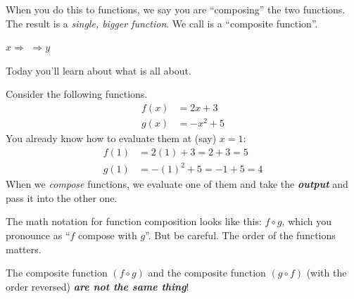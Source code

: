 \documentclass[fleqn,letterpaper,12pt,printwatermark=false]{memoir}
\begin{document}
\begin{myLesson}
    When you do this to functions,
    we say you are ``composing'' the two functions.
    The result is a \emph{single, bigger function}.
    We call is a ``composite function''.

    \begin{center}
    \vspace{2em}
    \(
        x
        \Longrightarrow
    \)
    \(
        \Longrightarrow
        y
    \)
    \vspace{2em}
    \end{center}
    Today you'll learn about what 
    is all about.
\end{myLesson}

\begin{myLesson}[][1]
    Consider the following functions.
    \begin{align*}
        f(x) &= 2x + 3 \\
        g(x) &= -x^2 + 5
    \end{align*}
    You already know how to evaluate them at (say) $x=1$:
    \begin{align*}
        f(1) &= 2(1) + 3   = 2+3    = 5\\
        g(1) &= -(1)^2 + 5 = -1 + 5 = 4
    \end{align*}
    When we \emph{compose} functions, 
    we evaluate one of them and take the {\bfseries\itshape output} and pass it 
    into the other one.

    The math notation for function composition looks like this:
    $f \circ g$,
    which you pronounce as ``$f$ compose with $g$''. 
    But be careful.
    The order of the functions matters.
    \begin{myLessonBox}
        The composite function $(f \circ g)$ 
        and
        the composite function $(g \circ f)$ 
        (with the order reversed)
        {\bfseries\itshape are not the same thing}!
    \end{myLessonBox}
\end{myLesson}
\end{document}
